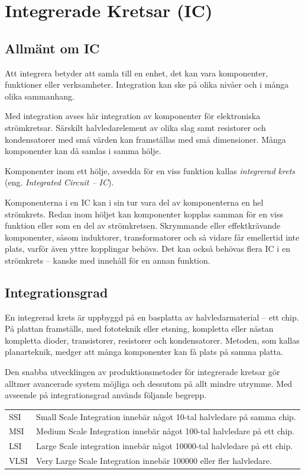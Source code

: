 \section{Integrerade Kretsar (IC)}
\label{integrerade kretsar}

\subsection{Allmänt om IC}

Att integrera betyder att samla till en enhet, det kan vara komponenter,
funktioner eller verksamheter. Integration kan ske på olika nivåer och i många
olika sammanhang.

Med integration avses här integration av komponenter för elektroniska strömkretsar. Särskilt
halvledarelement av olika slag samt resistorer och kondensatorer med små värden kan framställas med små dimensioner. Många komponenter kan då samlas i samma hölje.

Komponenter inom ett hölje, avsedda för en viss funktion kallas \emph{integrerad krets} (eng. \emph{Integrated Circuit -- IC}).

Komponenterna i en IC kan i sin tur vara del av komponenterna en hel strömkrets.
Redan inom höljet kan komponenter kopplas samman för en viss funktion eller som
en del av strömkretsen. Skrymmande eller effektkrävande komponenter, såsom
induktorer, transformatorer och så vidare får emellertid inte plats, varför även yttre
kopplingar behövs. Det kan också behövas flera IC i en strömkrets -- kanske med
innehåll för en annan funktion.

\subsection{Integrationsgrad}

En integrerad krets är uppbyggd på en basplatta av halvledarmaterial -- ett chip.
På plattan framställs, med fototeknik eller etsning, kompletta eller nästan kompletta dioder, transistorer, resistorer och kondensatorer. Metoden, som kallas planarteknik, medger att många komponenter kan få plats på samma platta.

Den snabba utvecklingen av produktionsmetoder för integrerade kretsar gör alltmer avancerade system möjliga och dessutom på allt mindre utrymme. Med avseende på integrationsgrad används följande begrepp.

\begin{tabular}{lp{6cm}}
SSI & Small Scale Integration innebär något 10-tal halvledare på samma chip. \\
MSI & Medium Scale Integration innebär något 100-tal halvledare på ett chip. \\
LSI & Large Scale integration innebär något 10000-tal halvledare på ett chip. \\
VLSI & Very Large Scale Integration innebär 100000 eller fler halvledare. \\
\end{tabular}

